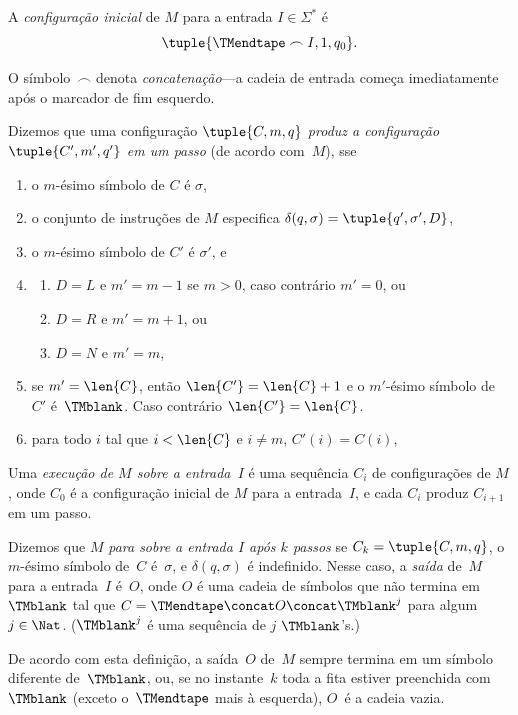 \documentclass[../../../include/open-logic-section]{subfiles}
\begin{document}
\begin{defn}
A \emph{configuração inicial} de $M$ para a entrada $I \in \Sigma^*$ é
\[
\tuple{\TMendtape \frown I, 1, q_0}.
\]
\end{defn}

\begin{explain}
O símbolo~$\frown$ denota \emph{concatenação}---a cadeia de entrada
começa imediatamente após o marcador de fim esquerdo.
\end{explain}

\begin{defn}
Dizemos que uma configuração $\tuple{C, m, q}$ \emph{produz a
configuração $\tuple{C', m', q'}$ em um passo} (de acordo com~$M$),
sse
\begin{enumerate}
\item o $m$-ésimo símbolo de $C$ é $\sigma$,
\item o conjunto de instruções de $M$ especifica $\delta(q, \sigma) =
  \tuple{q', \sigma', D}$,
\item o $m$-ésimo símbolo de $C'$ é $\sigma'$, e 
\item
\begin{enumerate}
\item $D = L$ e $m' = m - 1$ se $m>0$, caso contrário $m'=0$, ou
\item $D = R$ e $m' = m + 1$, ou
\item $D = N$ e $m' = m$,
\end{enumerate}
\item se $m' = \len{C}$, então $\len{C'} = \len{C} + 1$ e o $m'$-ésimo
  símbolo de $C'$ é~$\TMblank$. Caso contrário $\len{C'}=\len{C}$.
\item para todo $i$ tal que $i < \len{C}$ e $i \neq m$, $C'(i) = C(i)$,
\end{enumerate}
\end{defn}

\begin{defn}
Uma \emph{execução de $M$ sobre a entrada~$I$} é uma sequência $C_i$ de configurações
de $M$, onde $C_0$ é a configuração inicial de $M$ para a entrada~$I$,
e cada $C_i$ produz $C_{i+1}$ em um passo.

Dizemos que $M$ \emph{para sobre a entrada $I$ após $k$ passos} se $C_k =
\tuple{C, m, q}$, o $m$-ésimo símbolo de~$C$ é~$\sigma$, e $\delta(q,
\sigma)$ é indefinido. Nesse caso, a \emph{saída} de~$M$ para a
entrada~$I$ é~$O$, onde $O$ é uma cadeia de símbolos que não termina
em~$\TMblank$ tal que $C = \TMendtape \concat O \concat \TMblank^j$
para algum~$j \in \Nat$. ($\TMblank^j$ é uma sequência de $j$ $\TMblank$'s.)
\end{defn}

\begin{explain}
De acordo com esta definição, a saída~$O$ de~$M$ sempre 
termina em um símbolo diferente de~$\TMblank$, ou, se no instante~$k$ toda a
fita estiver preenchida com~$\TMblank$ (exceto o~$\TMendtape$ mais à esquerda),
$O$~é a cadeia vazia.
\end{explain}
\end{document}
